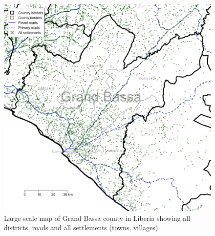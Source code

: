 \documentclass[12pt,a4paper]{book}
\theoremstyle{definition}
\theoremstyle{definition}
\theoremstyle{definition}
\theoremstyle{remark}
\begin{document}
\begin{figure}[H]

{\centering \includegraphics{figures/largeScaleMapCounty2-1} 

}

\caption{Large scale map of Grand Bassa county in Liberia showing all districts, roads and all settlements (towns, villages)}\label{fig:largeScaleMapCounty2}
\end{figure}

\newpage
\end{document}
